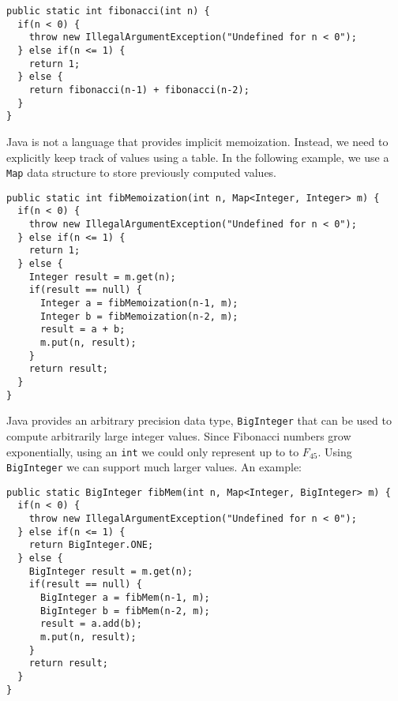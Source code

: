 \begin{verbatim}
public static int fibonacci(int n) {
  if(n < 0) {
    throw new IllegalArgumentException("Undefined for n < 0");
  } else if(n <= 1) {
    return 1;
  } else {
    return fibonacci(n-1) + fibonacci(n-2);
  }
}
\end{verbatim}

Java is not a language that provides implicit memoization.  Instead, 
we need to explicitly keep track of values using a table.  In the 
following example, we use a \texttt{Map} data structure
to store previously computed values.

\begin{verbatim}
public static int fibMemoization(int n, Map<Integer, Integer> m) {
  if(n < 0) {
    throw new IllegalArgumentException("Undefined for n < 0");
  } else if(n <= 1) {
    return 1;
  } else {
    Integer result = m.get(n);
    if(result == null) {
      Integer a = fibMemoization(n-1, m);
      Integer b = fibMemoization(n-2, m);
      result = a + b;
      m.put(n, result);
    }
    return result;
  }
}
\end{verbatim}

Java provides an arbitrary precision data type, \texttt{BigInteger}
that can be used to compute arbitrarily large integer values.  Since
Fibonacci numbers grow exponentially, using an \texttt{int} we could
only represent up to to $F_{45}$.  Using \texttt{BigInteger} we
can support much larger values.  An example:

\begin{verbatim}
public static BigInteger fibMem(int n, Map<Integer, BigInteger> m) {
  if(n < 0) {
    throw new IllegalArgumentException("Undefined for n < 0");
  } else if(n <= 1) {
    return BigInteger.ONE;
  } else {
    BigInteger result = m.get(n);
    if(result == null) {
      BigInteger a = fibMem(n-1, m);
      BigInteger b = fibMem(n-2, m);
      result = a.add(b);
      m.put(n, result);
    }
    return result;
  }
}  
\end{verbatim}




